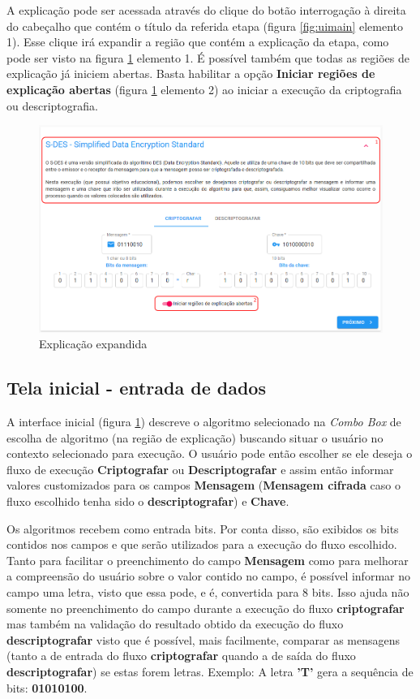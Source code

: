 A explicação pode ser acessada através do clique do botão interrogação à direita do cabeçalho que contém o título da referida etapa (figura \ref{fig:uimain} elemento 1). Esse clique irá expandir a região que contém a explicação da etapa, como pode ser visto na figura \ref{fig:uimainopen} elemento 1. É possível também que todas as regiões de explicação já iniciem abertas. Basta habilitar a opção \textbf{Iniciar regiões de explicação abertas} (figura \ref{fig:uimainopen} elemento 2) ao iniciar a execução da criptografia ou descriptografia.

\begin{figure}[H]
    \centering
    \caption{Explicação expandida}
    \label{fig:uimainopen}
    \includegraphics[width=1\linewidth]{UI/UIMainOpen.png}
\end{figure}

\subsection{Tela inicial - entrada de dados}

A interface inicial (figura \ref{fig:uimainopen}) descreve o algoritmo selecionado na \textit{Combo Box} de escolha de algoritmo (na região de explicação) buscando situar o usuário no contexto selecionado para execução. O usuário pode então escolher se ele deseja o fluxo de execução \textbf{Criptografar} ou \textbf{Descriptografar} e assim então informar valores customizados para os campos \textbf{Mensagem} (\textbf{Mensagem cifrada} caso o fluxo escolhido tenha sido o \textbf{descriptografar}) e \textbf{Chave}.

Os algoritmos recebem como entrada bits. Por conta disso, são exibidos os bits contidos nos campos e que serão utilizados para a execução do fluxo escolhido. Tanto para facilitar o preenchimento do campo \textbf{Mensagem} como para melhorar a compreensão do usuário sobre o valor contido no campo, é possível informar no campo uma letra, visto que essa pode, e é, convertida para 8 bits. Isso ajuda não somente no preenchimento do campo durante a execução do fluxo \textbf{criptografar} mas também na validação do resultado obtido da execução do fluxo \textbf{descriptografar} visto que é possível, mais facilmente, comparar as mensagens (tanto a de entrada do fluxo \textbf{criptografar} quando a de saída do fluxo \textbf{descriptografar}) se estas forem letras. Exemplo: A letra \textbf{'T'} gera a sequência de bits: \textbf{01010100}.

